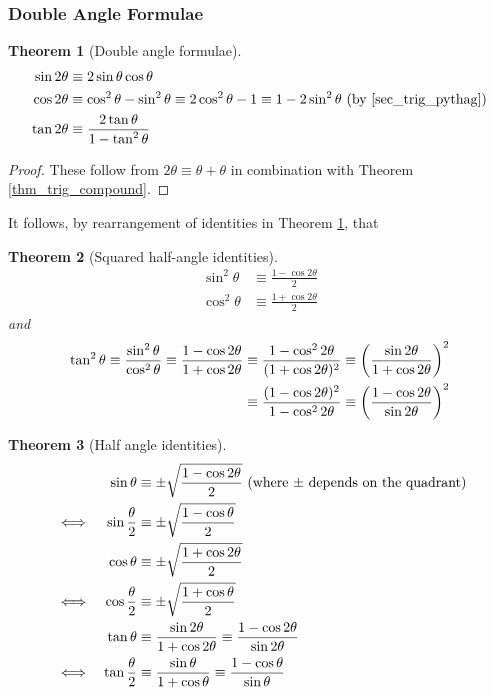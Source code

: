 \documentclass[fleqn,a4paper,11pt]{article}
\newtheorem{theorem}{Theorem}[section]
\begin{document}
    \subsubsection{Double Angle Formulae} \label{sec_trig_double_angle}
    \begin{theorem}[Double angle formulae] \label{thm_trig_double_angle}
    \begin{align*}
    \sin 2\theta &\equiv
       2\sin \theta \cos \theta \\
    \cos 2\theta &\equiv
       \cos^2 \theta - \sin^2 \theta \equiv
       2\cos^2 \theta - 1 \equiv 1 - 2\sin^2 \theta
       \ \text{(by \ref{sec_trig_pythag})} \\
    \tan 2\theta &\equiv
        \frac{2\tan \theta}{1 - \tan^2 \theta}
    \end{align*}
    \end{theorem}
    \begin{proof}
    These follow from \(2\theta \equiv \theta + \theta\) in combination with
    Theorem \ref{thm_trig_compound}.
    \end{proof}
    It follows, by rearrangement of identities in Theorem
    \ref{thm_trig_double_angle}, that
    \begin{theorem}[Squared half-angle identities]
    \begin{align*}
    \sin^2 \theta &\equiv
        \frac{1 - \cos 2 \theta} 2 \\
    \cos^2 \theta &\equiv
        \frac{1 + \cos 2 \theta} 2
    \end{align*}
    and
    \begin{align*}
    \tan^2 \theta \equiv \frac{\sin^2 \theta}{\cos^2 \theta}
        \equiv \frac{1 - \cos 2 \theta}{1 + \cos 2 \theta}
        &\equiv \frac{1 - \cos^2 2 \theta}{(1 + \cos 2 \theta)^2}
        \equiv \pqty{\frac{\sin 2 \theta}{1 + \cos 2 \theta}}^2 \\
        &\equiv \frac{(1 - \cos 2 \theta)^2}{1 - \cos^2 2 \theta}
        \equiv \pqty{\frac{1 - \cos 2 \theta}{\sin 2 \theta}}^2
    \end{align*}
    \end{theorem}
    \begin{theorem}[Half angle identities] \label{thm_trig_half_angle}
    \begin{alignat*}{2}
    &&\sin \theta &\equiv
        \pm\sqrt{\frac{1 - \cos 2 \theta} 2}
     \ \pqty{\text{where \(\pm\) depends on the quadrant}} \\
    &\iff& \sin \frac \theta 2 &\equiv
        \pm\sqrt{\frac{1 - \cos \theta} 2} \\
    &&\cos \theta &\equiv
        \pm\sqrt{\frac{1 + \cos 2 \theta} 2} \\
    &\iff& \cos \frac \theta 2 &\equiv
        \pm\sqrt{\frac{1 + \cos \theta} 2} \\
    &&\tan \theta &\equiv
        \frac{\sin 2 \theta}{1 + \cos 2 \theta}
        \equiv \frac{1 - \cos 2 \theta}{\sin 2 \theta} \\
    &\iff& \tan \frac \theta 2 &\equiv
        \frac{\sin \theta}{1 + \cos \theta}
        \equiv \frac{1 - \cos \theta}{\sin \theta}
    \end{alignat*}
    \end{theorem}
\end{document}
